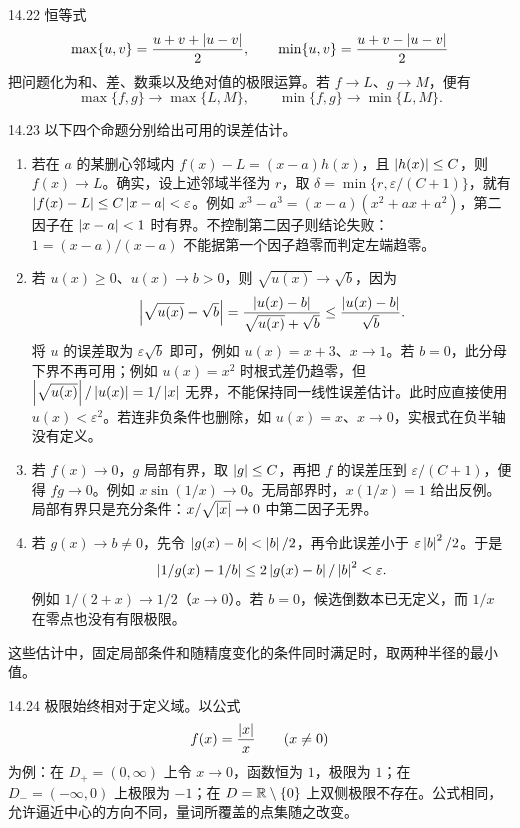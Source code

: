 \begin{solution}{14.22}
恒等式
\[
 \max\{u,v\}=\frac{u+v+\left|u-v\right|}2,\qquad
 \min\{u,v\}=\frac{u+v-\left|u-v\right|}2
\]
把问题化为和、差、数乘以及绝对值的极限运算。若 \(f\to L\)、\(g\to M\)，便有
\[
 \max\{f,g\}\to\max\{L,M\},\qquad
 \min\{f,g\}\to\min\{L,M\}.
\]
\end{solution}

\begin{solution}{14.23}
以下四个命题分别给出可用的误差估计。
\begin{enumerate}
 \item 若在 \(a\) 的某删心邻域内 \(f(x)-L=(x-a)h(x)\)，且 \(\left|h(x)\right|\le C\)，则 \(f(x)\to L\)。确实，设上述邻域半径为 \(r\)，取 \(\delta=\min\{r,\varepsilon/(C+1)\}\)，就有 \(\left|f(x)-L\right|\le C\left|x-a\right|<\varepsilon\)。例如 \(x^3-a^3=(x-a)(x^2+ax+a^2)\)，第二因子在 \(\left|x-a\right|<1\) 时有界。不控制第二因子则结论失败：\(1=(x-a)/(x-a)\) 不能据第一个因子趋零而判定左端趋零。
 \item 若 \(u(x)\ge0\)、\(u(x)\to b>0\)，则 \(\sqrt{u(x)}\to\sqrt b\)，因为
 \[
 \left|\sqrt{u(x)}-\sqrt b\right|
 =\frac{\left|u(x)-b\right|}{\sqrt{u(x)}+\sqrt b}
 \le\frac{\left|u(x)-b\right|}{\sqrt b}.
 \]
 将 \(u\) 的误差取为 \(\varepsilon\sqrt b\) 即可，例如 \(u(x)=x+3\)、\(x\to1\)。若 \(b=0\)，此分母下界不再可用；例如 \(u(x)=x^2\) 时根式差仍趋零，但 \(\left|\sqrt{u(x)}\right|/\left|u(x)\right|=1/\left|x\right|\) 无界，不能保持同一线性误差估计。此时应直接使用 \(u(x)<\varepsilon^2\)。若连非负条件也删除，如 \(u(x)=x\)、\(x\to0\)，实根式在负半轴没有定义。
 \item 若 \(f(x)\to0\)，\(g\) 局部有界，取 \(\left|g\right|\le C\)，再把 \(f\) 的误差压到 \(\varepsilon/(C+1)\)，便得 \(fg\to0\)。例如 \(x\sin(1/x)\to0\)。无局部界时，\(x(1/x)=1\) 给出反例。局部有界只是充分条件：\(x/\sqrt{\left|x\right|}\to0\) 中第二因子无界。
 \item 若 \(g(x)\to b\ne0\)，先令 \(\left|g(x)-b\right|<\left|b\right|/2\)，再令此误差小于 \(\varepsilon\left|b\right|^2/2\)。于是
 \[
 \left|1/g(x)-1/b\right|\le 2\left|g(x)-b\right|/\left|b\right|^2<\varepsilon.
 \]
 例如 \(1/(2+x)\to1/2\)（\(x\to0\)）。若 \(b=0\)，候选倒数本已无定义，而 \(1/x\) 在零点也没有有限极限。
\end{enumerate}
这些估计中，固定局部条件和随精度变化的条件同时满足时，取两种半径的最小值。
\end{solution}

\begin{solution}{14.24}
极限始终相对于定义域。以公式
\[
 f(x)=\frac{\left|x\right|}{x}\qquad(x\ne0)
\]
为例：在 \(D_+=(0,\infty)\) 上令 \(x\to0\)，函数恒为 \(1\)，极限为 \(1\)；在 \(D_-=(-\infty,0)\) 上极限为 \(-1\)；在 \(D=\mathbb{R}\setminus\{0\}\) 上双侧极限不存在。公式相同，允许逼近中心的方向不同，量词所覆盖的点集随之改变。
\end{solution}

